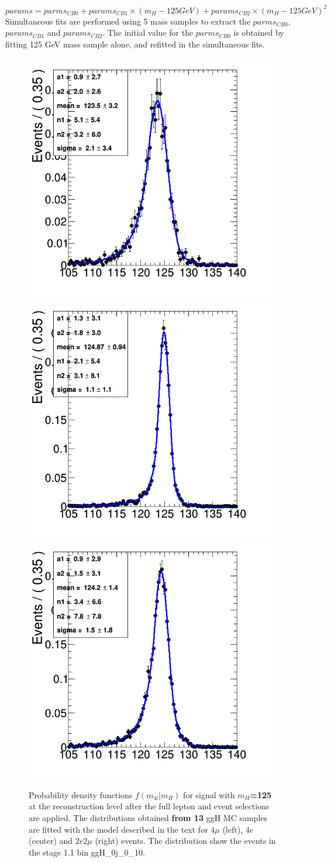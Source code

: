 %
\begin{equation}
	params = parms_{CB0} + params_{CB1} \times (m_{H} -125 GeV) + params_{CB2} \times (m_{H} -125 GeV) ^2 
\label{eq:linear}
\end{equation}
%
Simultaneous fits are performed using 5 mass samples to extract the $parms_{CB0}$, $params_{CB1}$ and $params_{CB2}$. The initial value for the $parms_{CB0}$ is obtained by fitting 125 GeV mass sample alone, and refitted in the simultaneous fits.
\begin{figure}[!h]
\centering
\includegraphics[width=0.32\linewidth]{Figures/Signal/fit_stage_ggH_0j_0_10_4e2018.png} %
\includegraphics[width=0.32\linewidth]{Figures/Signal/fit_stage_ggH_0j_0_10_4mu2018.png} %
\includegraphics[width=0.32\linewidth]{Figures/Signal/fit_stage_ggH_0j_0_10_2e2mu2018.png} %
\caption{Probability density functions $f(m_{4l}|m_{H})$ for signal
  with {\bf $m_H$=125 \GeV} at the reconstruction level after the full lepton and event selections are applied. The distributions obtained {\bf from 13\TeV} ggH  MC samples are fitted with the model described in the text for  $4\mu$ (left), $4e$ (center) and $2e2\mu$ (right) events. The distribution show the events in the stage 1.1 bin ggH\_0j\_0\_10.  
\label{fig:sigShapeFits13TeV125}}
\end{figure}


